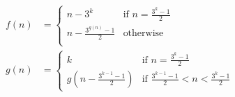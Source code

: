 \documentclass{article}
\begin{document}
\thispagestyle{empty}

\begin{align*}
  f(n) &= \begin{cases}
    n- 3^k &\mbox{if } n = \frac{3^k - 1}{2} \\
    n - \frac{3^{g(n)} - 1}{2} & \mbox{otherwise}\\
  \end{cases}\\
  g(n) &= \begin{cases}
    k &\mbox{if } n = \frac{3^k - 1}{2} \\
    g(n - \frac{3^{k - 1} - 1}{2}) & \mbox{if } \frac{3^{k - 1} - 1}{2} < n < \frac{3^k - 1}{2}
  \end{cases}\\
\end{align*}
\end{document}
